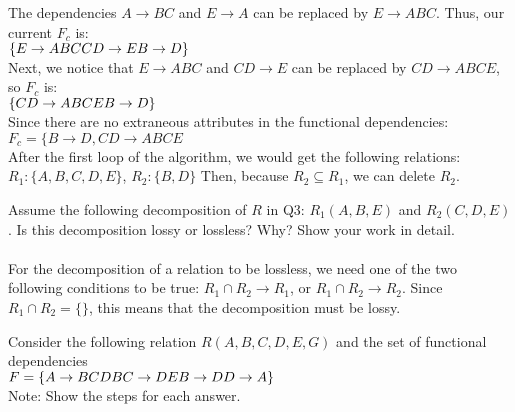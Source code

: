 \documentclass[a4 paper]{article}
\begin{document}
The dependencies $A\rightarrow BC$ and $E\rightarrow A$ can be replaced by $E\rightarrow ABC$. Thus, our current $F_c$ is:\\
$\{
\\E \rightarrow ABC\\
CD \rightarrow E\\
B \rightarrow D\}$\\

Next, we notice that $E \rightarrow ABC$ and $CD \rightarrow E$ can be replaced by $CD\rightarrow ABCE$, so $F_c$ is:\\
$\{
\\CD \rightarrow ABCE\\
B \rightarrow D\}$\\


Since there are no extraneous attributes in the functional dependencies:
$F_c=\{B\rightarrow D, CD\rightarrow ABCE$\\
After the first loop of the algorithm, we would get the following relations:\\
$R_1:\{A,B,C,D,E\}$, $R_2:\{B,D\}$
Then, because $R_2\subseteq R_1$, we can delete $R_2$.


Assume the following decomposition of $R$ in Q3: $R_{1}(A, B, E)$ and $R_{2}(C, D, E)$. Is this decomposition lossy or lossless? Why? Show your work in detail.\\\\
For the decomposition of a relation to be lossless, we need one of the two following conditions to be true: $R_1 \cap R_2\rightarrow R_1$, or $R_1 \cap R_2\rightarrow R_2$.
Since $R_1\cap R_2=\{\}$, this means that the decomposition must be lossy.



Consider the following relation $R(A, B, C, D, E, G)$ and the set of functional dependencies \\$F = \{
\\A \rightarrow BCD\\
BC \rightarrow DE\\
B \rightarrow D\\
D \rightarrow A\}$\\

\noindent Note: Show the steps for each answer.
\end{document}
